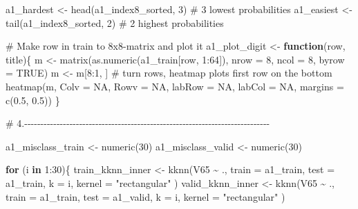 \documentclass[
  english,
  11pt,
]{article}
\newenvironment{Shaded}{\begin{snugshade}}{\end{snugshade}}
\newcommand{\AttributeTok}[1]{\textcolor[rgb]{0.40,0.45,0.13}{#1}}
\newcommand{\CommentTok}[1]{\textcolor[rgb]{0.37,0.37,0.37}{#1}}
\newcommand{\ConstantTok}[1]{\textcolor[rgb]{0.56,0.35,0.01}{#1}}
\newcommand{\ControlFlowTok}[1]{\textcolor[rgb]{0.00,0.23,0.31}{\textbf{#1}}}
\newcommand{\DecValTok}[1]{\textcolor[rgb]{0.68,0.00,0.00}{#1}}
\newcommand{\FloatTok}[1]{\textcolor[rgb]{0.68,0.00,0.00}{#1}}
\newcommand{\FunctionTok}[1]{\textcolor[rgb]{0.28,0.35,0.67}{#1}}
\newcommand{\NormalTok}[1]{\textcolor[rgb]{0.00,0.23,0.31}{#1}}
\newcommand{\OtherTok}[1]{\textcolor[rgb]{0.00,0.23,0.31}{#1}}
\newcommand{\SpecialCharTok}[1]{\textcolor[rgb]{0.37,0.37,0.37}{#1}}
\newcommand{\StringTok}[1]{\textcolor[rgb]{0.13,0.47,0.30}{#1}}
\begin{document}
\begin{Shaded}
\begin{Highlighting}[]
\NormalTok{a1\_hardest }\OtherTok{\textless{}{-}} \FunctionTok{head}\NormalTok{(a1\_index8\_sorted, }\DecValTok{3}\NormalTok{) }\CommentTok{\# 3 lowest probabilities}
\NormalTok{a1\_easiest }\OtherTok{\textless{}{-}} \FunctionTok{tail}\NormalTok{(a1\_index8\_sorted, }\DecValTok{2}\NormalTok{) }\CommentTok{\# 2 highest probabilities}

\CommentTok{\# Make row in train to 8x8{-}matrix and plot it}
\NormalTok{a1\_plot\_digit }\OtherTok{\textless{}{-}} \ControlFlowTok{function}\NormalTok{(row, title)\{}
\NormalTok{  m }\OtherTok{\textless{}{-}} \FunctionTok{matrix}\NormalTok{(}\FunctionTok{as.numeric}\NormalTok{(a1\_train[row, }\DecValTok{1}\SpecialCharTok{:}\DecValTok{64}\NormalTok{]), }\AttributeTok{nrow =} \DecValTok{8}\NormalTok{, }\AttributeTok{ncol =} \DecValTok{8}\NormalTok{, }\AttributeTok{byrow =} \ConstantTok{TRUE}\NormalTok{)}
\NormalTok{  m }\OtherTok{\textless{}{-}}\NormalTok{ m[}\DecValTok{8}\SpecialCharTok{:}\DecValTok{1}\NormalTok{, ] }\CommentTok{\# turn rows, heatmap plots first row on the bottom}
  \FunctionTok{heatmap}\NormalTok{(m, }\AttributeTok{Colv =} \ConstantTok{NA}\NormalTok{, }\AttributeTok{Rowv =} \ConstantTok{NA}\NormalTok{, }\AttributeTok{labRow =} \ConstantTok{NA}\NormalTok{, }\AttributeTok{labCol =} \ConstantTok{NA}\NormalTok{,}
          \AttributeTok{margins =} \FunctionTok{c}\NormalTok{(}\FloatTok{0.5}\NormalTok{, }\FloatTok{0.5}\NormalTok{))}
\NormalTok{\}}

\CommentTok{\# 4.{-}{-}{-}{-}{-}{-}{-}{-}{-}{-}{-}{-}{-}{-}{-}{-}{-}{-}{-}{-}{-}{-}{-}{-}{-}{-}{-}{-}{-}{-}{-}{-}{-}{-}{-}{-}{-}{-}{-}{-}{-}{-}{-}{-}{-}{-}{-}{-}{-}{-}{-}{-}{-}{-}{-}{-}{-}{-}{-}{-}{-}{-}{-}{-}{-}{-}{-}{-}{-}{-}{-}{-}{-}{-}{-}{-}}

\NormalTok{a1\_misclass\_train }\OtherTok{\textless{}{-}} \FunctionTok{numeric}\NormalTok{(}\DecValTok{30}\NormalTok{)}
\NormalTok{a1\_misclass\_valid }\OtherTok{\textless{}{-}} \FunctionTok{numeric}\NormalTok{(}\DecValTok{30}\NormalTok{)}

\ControlFlowTok{for}\NormalTok{ (i }\ControlFlowTok{in} \DecValTok{1}\SpecialCharTok{:}\DecValTok{30}\NormalTok{)\{}
\NormalTok{  train\_kknn\_inner }\OtherTok{\textless{}{-}} \FunctionTok{kknn}\NormalTok{(V65 }\SpecialCharTok{\textasciitilde{}}\NormalTok{ .,}
                     \AttributeTok{train =}\NormalTok{ a1\_train,}
                     \AttributeTok{test =}\NormalTok{ a1\_train,}
                     \AttributeTok{k =}\NormalTok{ i,}
                     \AttributeTok{kernel =} \StringTok{"rectangular"}
\NormalTok{  )}
\NormalTok{  valid\_kknn\_inner }\OtherTok{\textless{}{-}} \FunctionTok{kknn}\NormalTok{(V65 }\SpecialCharTok{\textasciitilde{}}\NormalTok{ .,}
                     \AttributeTok{train =}\NormalTok{ a1\_train,}
                     \AttributeTok{test =}\NormalTok{ a1\_valid,}
                     \AttributeTok{k =}\NormalTok{ i,}
                     \AttributeTok{kernel =} \StringTok{"rectangular"}
\NormalTok{  )}


\end{Highlighting}
\end{Shaded}
\end{document}
